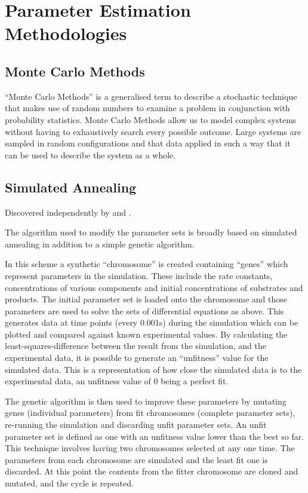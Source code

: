 \chapter{Parameter Estimation Methodologies}

\section{Monte Carlo Methods}

``Monte Carlo Methods'' is a generalised term to describe a stochastic technique that makes use of random numbers to examine a problem in conjunction with probability statistics. Monte Carlo Methods allow us to model complex systems without having to exhaustively search every possible outcome. Large systems are sampled in random configurations and that data applied in such a way that it can be used to describe the system as a whole.

\section{Simulated Annealing}

Discovered independently by \citet{Kirkpatrick1983} and \citet{Cerny1985}.
\citet{Bertsimas1993}

The algorithm used to modify the parameter sets is broadly based on simulated annealing in addition to a simple genetic algorithm.
 
In this scheme a synthetic ``chromosome'' is created containing ``genes'' which represent parameters in the simulation. These include the rate constants, concentrations of various components and initial concentrations of substrates and products. The initial parameter set is loaded onto the chromosome and those parameters are used to solve the sets of differential equations as above. This generates data at time points (every 0.001s) during the simulation which can be plotted and compared against known experimental values. By calculating the least-squares-difference between the result from the simulation, and the experimental data, it is possible to generate an ``unfitness'' value for the simulated data. This is a representation of how close the simulated data is to the experimental data, an unfitness value of 0 being a perfect fit. 

The genetic algorithm is then used to improve these parameters by mutating genes (individual parameters) from fit chromosomes (complete parameter sets), re-running the simulation and discarding unfit parameter sets. An unfit parameter set is defined as one with an unfitness value lower than the best so far. This technique involves having two chromosomes selected at any one time. The parameters from each chromosome are simulated and the least fit one is discarded. At this point the contents from the fitter chromosome are cloned and mutated, and the cycle is repeated.

